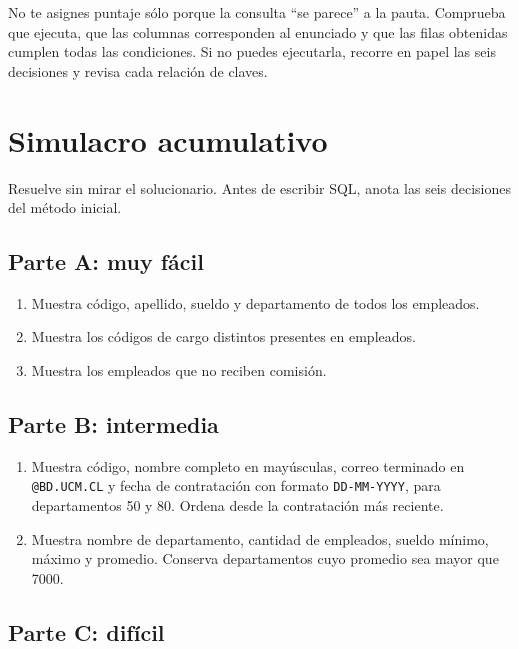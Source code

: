 \documentclass[11pt,a4paper]{article}
\newcommand{\campo}[1]{\texttt{#1}}
\begin{document}
\begin{pausa}
No te asignes puntaje sólo porque la consulta ``se parece'' a la pauta. Comprueba que ejecuta, que
las columnas corresponden al enunciado y que las filas obtenidas cumplen todas las condiciones. Si
no puedes ejecutarla, recorre en papel las seis decisiones y revisa cada relación de claves.
\end{pausa}

\section{Simulacro acumulativo}

Resuelve sin mirar el solucionario. Antes de escribir SQL, anota las seis decisiones del método
inicial.

\subsection*{Parte A: muy fácil}

\begin{enumerate}[label=\textbf{S.\arabic*}]
  \item Muestra código, apellido, sueldo y departamento de todos los empleados.
  \item Muestra los códigos de cargo distintos presentes en empleados.
  \item Muestra los empleados que no reciben comisión.
\end{enumerate}

\subsection*{Parte B: intermedia}

\begin{enumerate}[label=\textbf{S.\arabic*},resume]
  \item Muestra código, nombre completo en mayúsculas, correo terminado en \campo{@BD.UCM.CL} y fecha
  de contratación con formato \campo{DD-MM-YYYY}, para departamentos 50 y 80. Ordena desde la
  contratación más reciente.
  \item Muestra nombre de departamento, cantidad de empleados, sueldo mínimo, máximo y promedio.
  Conserva departamentos cuyo promedio sea mayor que 7000.
\end{enumerate}

\subsection*{Parte C: difícil}
\end{document}
